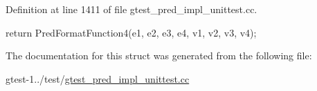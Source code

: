 \-Definition at line 1411 of file gtest\-\_\-pred\-\_\-impl\-\_\-unittest.\-cc.


\begin{DoxyCode}
                                                          {
    return PredFormatFunction4(e1, e2, e3, e4, v1, v2, v3, v4);
  }
\end{DoxyCode}


\-The documentation for this struct was generated from the following file\-:\begin{DoxyCompactItemize}
\item 
gtest-\/1../test/\hyperlink{gtest__pred__impl__unittest_8cc}{gtest\-\_\-pred\-\_\-impl\-\_\-unittest.\-cc}\end{DoxyCompactItemize}
